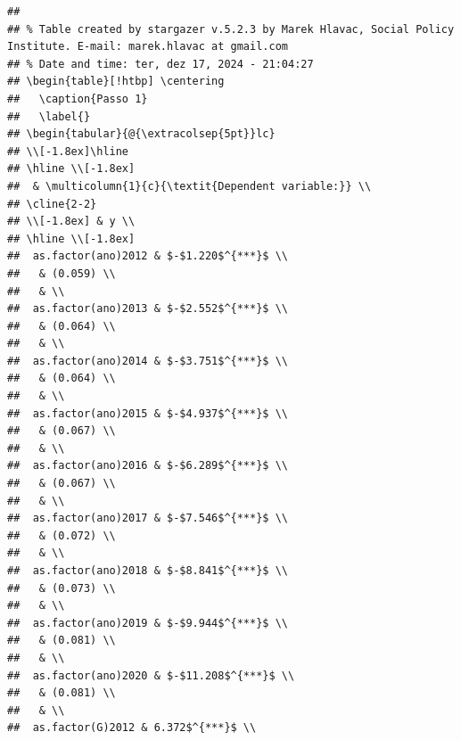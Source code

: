 \documentclass[
]{article}
\begin{document}
\begin{verbatim}
## 
## % Table created by stargazer v.5.2.3 by Marek Hlavac, Social Policy Institute. E-mail: marek.hlavac at gmail.com
## % Date and time: ter, dez 17, 2024 - 21:04:27
## \begin{table}[!htbp] \centering 
##   \caption{Passo 1} 
##   \label{} 
## \begin{tabular}{@{\extracolsep{5pt}}lc} 
## \\[-1.8ex]\hline 
## \hline \\[-1.8ex] 
##  & \multicolumn{1}{c}{\textit{Dependent variable:}} \\ 
## \cline{2-2} 
## \\[-1.8ex] & y \\ 
## \hline \\[-1.8ex] 
##  as.factor(ano)2012 & $-$1.220$^{***}$ \\ 
##   & (0.059) \\ 
##   & \\ 
##  as.factor(ano)2013 & $-$2.552$^{***}$ \\ 
##   & (0.064) \\ 
##   & \\ 
##  as.factor(ano)2014 & $-$3.751$^{***}$ \\ 
##   & (0.064) \\ 
##   & \\ 
##  as.factor(ano)2015 & $-$4.937$^{***}$ \\ 
##   & (0.067) \\ 
##   & \\ 
##  as.factor(ano)2016 & $-$6.289$^{***}$ \\ 
##   & (0.067) \\ 
##   & \\ 
##  as.factor(ano)2017 & $-$7.546$^{***}$ \\ 
##   & (0.072) \\ 
##   & \\ 
##  as.factor(ano)2018 & $-$8.841$^{***}$ \\ 
##   & (0.073) \\ 
##   & \\ 
##  as.factor(ano)2019 & $-$9.944$^{***}$ \\ 
##   & (0.081) \\ 
##   & \\ 
##  as.factor(ano)2020 & $-$11.208$^{***}$ \\ 
##   & (0.081) \\ 
##   & \\ 
##  as.factor(G)2012 & 6.372$^{***}$ \\ 

\end{verbatim}
\end{document}
